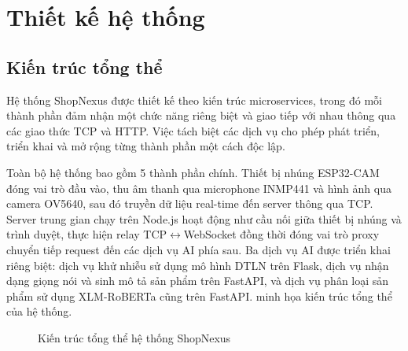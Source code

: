 \chapter{Thiết kế hệ thống}

\section{Kiến trúc tổng thể}

Hệ thống ShopNexus được thiết kế theo kiến trúc microservices, trong đó mỗi
thành phần đảm nhận một chức năng riêng biệt và giao tiếp với nhau thông qua
các giao thức TCP và HTTP. Việc tách biệt các dịch vụ cho phép phát triển,
triển khai và mở rộng từng thành phần một cách độc lập.

Toàn bộ hệ thống bao gồm 5 thành phần chính. Thiết bị nhúng ESP32-CAM đóng
vai trò đầu vào, thu âm thanh qua microphone INMP441 và hình ảnh qua camera
OV5640, sau đó truyền dữ liệu real-time đến server thông qua TCP. Server
trung gian chạy trên Node.js hoạt động như cầu nối giữa thiết bị nhúng và
trình duyệt, thực hiện relay TCP$\leftrightarrow$WebSocket đồng thời đóng vai
trò proxy chuyển tiếp request đến các dịch vụ AI phía sau. Ba dịch vụ AI
được triển khai riêng biệt: dịch vụ khử nhiễu sử dụng mô hình DTLN trên Flask,
dịch vụ nhận dạng giọng nói và sinh mô tả sản phẩm trên FastAPI, và dịch vụ
phân loại sản phẩm sử dụng XLM-RoBERTa cũng trên FastAPI.
 minh họa kiến trúc tổng thể của hệ thống.

\begin{figure}[htbp]
\centering
{}
\caption{Kiến trúc tổng thể hệ thống ShopNexus}
\label{fig:system-architecture}
\end{figure}

